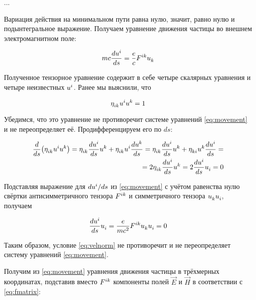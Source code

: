 \documentclass{article}
\begin{document}
...

Вариация действия на минимальном пути равна нулю, значит, равно нулю и подынтегральное выражение. Получаем уравнение движения частицы во внешнем электромагнитном поле:

\begin{equation}\label{eq:movement}
    mc\frac{d\tensor{u}{^i}}{ds}=\frac{e}{c}\tensor{F}{^i^k}\tensor{u}{_k}
\end{equation}

Полученное тензорное уравнение содержит в себе четыре скалярных уравнения и четыре неизвестных $\tensor{u}{^i}$. Ранее мы выяснили, что 

\begin{equation}\label{eq:velnorm}
    \tensor{\eta}{_i_k}\tensor{u}{^i}\tensor{u}{^k}=1
\end{equation}

Убедимся, что это уравнение не противоречит системе уравнений \eqref{eq:movement} и не переопределяет её. Продифференцируем его по $ds$:

\begin{equation*}
    \begin{split}
        \frac{d}{ds}\big(\tensor{\eta}{_i_k}\tensor{u}{^i}\tensor{u}{^k}\big)=\tensor{\eta}{_i_k}\frac{d\tensor{u}{^i}}{ds}\tensor{u}{^k}+\tensor{\eta}{_i_k}\tensor{u}{^i}\frac{d\tensor{u}{^k}}{ds}=\tensor{\eta}{_i_k}\frac{d\tensor{u}{^i}}{ds}\tensor{u}{^k}+\tensor{\eta}{_k_i}\tensor{u}{^k}\frac{d\tensor{u}{^i}}{ds}=\\
        =2\tensor{\eta}{_i_k}\frac{d\tensor{u}{^i}}{ds}\tensor{u}{^k}=2\frac{d\tensor{u}{^i}}{ds}\tensor{u}{_i}=0
    \end{split}
\end{equation*}

Подставляя выражение для $d\tensor{u}{^i}/ds$ из \eqref{eq:movement} с учётом равенства нулю свёртки антисимметричного тензора $\tensor{F}{^i^k}$ и симметричного тензора $\tensor{u}{_k}\tensor{u}{_i}$, получаем

\begin{equation*}
    \frac{d\tensor{u}{^i}}{ds}\tensor{u}{_i}=\frac{e}{mc^2}\tensor{F}{^i^k}\tensor{u}{_k}\tensor{u}{_i}=0 
\end{equation*}

Таким образом, условие \eqref{eq:velnorm} не противоречит и не переопределяет систему уравнений \eqref{eq:movement}.

Получим из \eqref{eq:movement} уравнения движения частицы в трёхмерных координатах, подставив вместо $\tensor{F}{^i^k}$ компоненты полей $\vec{E}$ и $\vec{H}$ в соответствии с \eqref{eq:fmatrix}:
\end{document}
